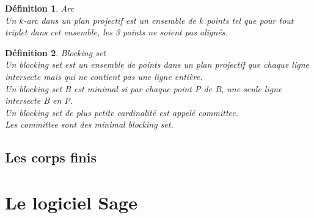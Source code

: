 \documentclass[a4paper]{article}
\newtheorem{Def}{Définition}
\begin{document}
\begin{Def}{Arc} \\
  Un $k$-arc dans un plan projectif est un ensemble de $k$ points tel que pour tout triplet dans cet ensemble, les 3 points ne soient pas alignés.
\end{Def}

\begin{Def}{Blocking set}\\
  Un \textit{blocking set} est un ensemble de points dans un plan projectif que chaque ligne intersecte mais qui ne contient pas une ligne entière.\\
  Un \textit{blocking set} B est minimal si par chaque point P de B, une seule ligne intersecte B en P.\\
  Un \textit{blocking set} de plus petite cardinalité est appelé \textit{committee}.\\
  Les \textit{committee} sont des \textit{minimal blocking set}.
\end{Def}
\subsection{Les corps finis}


\newpage

\section{Le logiciel Sage}
\end{document}
